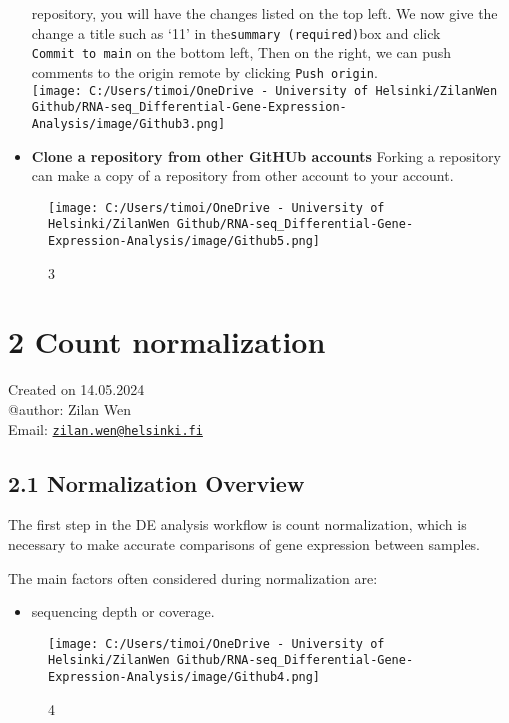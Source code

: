 \documentclass[
]{article}
\providecommand{\tightlist}{%
  \setlength{\itemsep}{0pt}\setlength{\parskip}{0pt}}
\begin{document}
\begin{itemize}
  repository, you will have the changes listed on the top left. We now
  give the change a title such as `11' in
  the\texttt{summary\ (required)}box and click \texttt{Commit\ to\ main}
  on the bottom left, Then on the right, we can push comments to the
  origin remote by clicking \texttt{Push\ origin}.\\
  \texttt{[image: C:/Users/timoi/OneDrive - University of Helsinki/ZilanWen Github/RNA-seq\_Differential-Gene-Expression-Analysis/image/Github3.png]}
\item
  \textbf{Clone a repository from other GitHUb accounts} Forking a
  repository can make a copy of a repository from other account to your
  account.\\
\end{itemize}

\begin{figure}
\centering
\texttt{[image: C:/Users/timoi/OneDrive - University of Helsinki/ZilanWen Github/RNA-seq\_Differential-Gene-Expression-Analysis/image/Github5.png]}
\caption{3}
\end{figure}

\section{2 Count normalization}\label{count-normalization}

Created on 14.05.2024\\
@author: Zilan Wen\\
Email:
\href{mailto:zilan.wen@helsinki.fi}{\nolinkurl{zilan.wen@helsinki.fi}}

\subsection{2.1 Normalization Overview}\label{normalization-overview}

The first step in the DE analysis workflow is count normalization, which
is necessary to make accurate comparisons of gene expression between
samples.

The main factors often considered during normalization are:

\begin{itemize}
\tightlist
\item
  sequencing depth or coverage.
\end{itemize}

\begin{figure}
\centering
\texttt{[image: C:/Users/timoi/OneDrive - University of Helsinki/ZilanWen Github/RNA-seq\_Differential-Gene-Expression-Analysis/image/Github4.png]}
\caption{4}
\end{figure}
\end{document}
